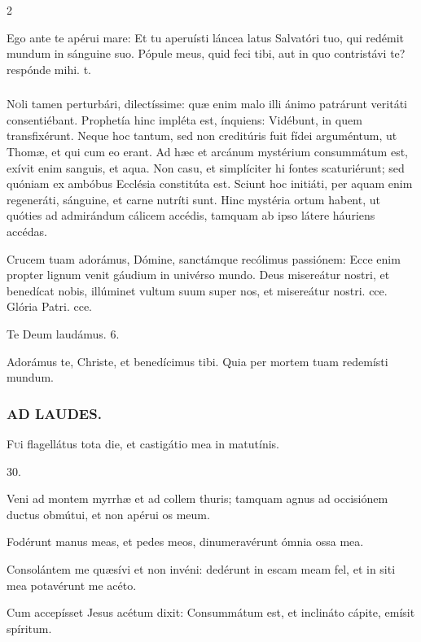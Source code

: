 \documentclass[9pt,twoside]{extarticle}
\begin{document}
\begin{multicols}{2}
\begin{tightlist}{}
\item {} Ego ante te apérui mare: \textred{*} Et tu aperuísti láncea latus Salvatóri tuo, qui redémit mundum in sánguine suo.  Pópule meus, quid feci tibi, aut in quo contristávi te? respónde mihi. t.
\end{tightlist}

\subsubsection*{\center{}}
\lettrine{N}oli tamen perturbári, dilectíssime: quæ enim malo illi ánimo patrárunt veritáti consentiébant. Prophetía hinc impléta est, ínquiens: Vidébunt, in quem transfixérunt. Neque hoc tantum, sed non creditúris fuit fídei arguméntum, ut Thomæ, et qui cum eo erant. Ad hæc et arcánum mystérium consummátum est, exívit enim sanguis, et aqua. Non casu, et simplíciter hi fontes scaturiérunt; sed quóniam ex ambóbus Ecclésia constitúta est. Sciunt hoc initiáti, per aquam enim regeneráti, sánguine, et carne nutríti sunt. Hinc mystéria ortum habent, ut quóties ad admirándum cálicem accédis, tamquam ab ipso látere háuriens accédas.

\begin{tightlist}{}
\item {} Crucem tuam adorámus, Dómine, sanctámque recólimus passiónem: \textred{*} Ecce enim propter lignum venit gáudium in univérso mundo.  Deus misereátur nostri, et benedícat nobis, illúminet vultum suum super nos, et misereátur nostri. cce. Glória Patri. cce.
\item Te Deum laudámus. 6.
\item {} Adorámus te, Christe, et benedícimus tibi.  Quia per mortem tuam redemísti mundum.
\end{tightlist}

\subsubsection*{\center \textsc{AD LAUDES.}}
\begin{center}\end{center}
\lettrine{F}ui flagellátus tota die, et castigátio mea in matutínis.

\begin{tightlist}{}
\item {} 30.
\item {} Veni ad montem myrrhæ et ad collem thuris; tamquam agnus ad occisiónem ductus obmútui, et non apérui os meum.
\item {} Fodérunt manus meas, et pedes meos, dinumeravérunt ómnia ossa mea.
\item {} Consolántem me quæsívi et non invéni: dedérunt in escam meam fel, et in siti mea potavérunt me acéto.
\item {} Cum accepísset Jesus acétum dixit: Consummátum est, et inclináto cápite, emísit spíritum.
\end{tightlist}


\end{multicols}
\end{document}
